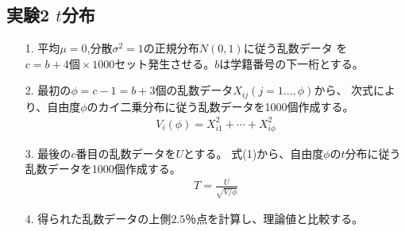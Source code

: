 \documentclass[12pt]{jarticle}
\begin{document}
\subsection{実験2 $t$分布}
\begin{itemize}
      \item [1.]平均$\mu=0$,分散$\sigma^2=1$の正規分布$N(0,1)$に従う乱数データ
            を$c=b+4個\times 1000セット$発生させる。$b$は学籍番号の下一桁とする。
      \item [2.]最初の$\phi=c-1=b+3$個の乱数データ$X_{ij}(j=1...,\phi)$から、
            次式により、自由度$\phi$のカイ二乗分布に従う乱数データを1000個作成する。
            \begin{eqnarray}
                  V_i(\phi)=X_{i1}^2+\cdots+X_{i\phi}^2\nonumber
            \end{eqnarray}
      \item [3.]最後の$c$番目の乱数データを$U$とする。
            式(1)から、自由度$\phi$の$t$分布に従う乱数データを1000個作成する。
            \begin{eqnarray}
                  T=\frac{U}{\sqrt{V/\phi}}
            \end{eqnarray}
      \item [4.]得られた乱数データの上側$2.5％$点を計算し、理論値と比較する。
\end{itemize}
\end{document}
